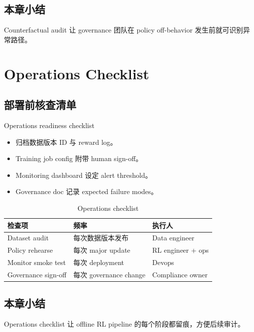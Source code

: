 \documentclass[a4paper]{article}
\begin{document}
\subsection{本章小结}

Counterfactual audit 让 governance 团队在 policy off-behavior 发生前就可识别异常路径。

\section{Operations Checklist}

\subsection{部署前核查清单}

\begin{knowledgebox}{Operations readiness checklist}
\begin{itemize}
    \item 归档数据版本 ID 与 reward log。
    \item Training job config 附带 human sign-off。
    \item Monitoring dashboard 设定 alert threshold。
    \item Governance doc 记录 expected failure modes。
\end{itemize}
\end{knowledgebox}

\begin{table}[H]
\centering
\begin{tabular}{p{} p{} p{}}
\toprule
检查项 & 频率 & 执行人 \\
\midrule
Dataset audit & 每次数据版本发布 & Data engineer \\
Policy rehearse & 每次 major update & RL engineer + ops \\
Monitor smoke test & 每次 deployment & Devops \\
Governance sign-off & 每次 governance change & Compliance owner \\
\bottomrule
\end{tabular}
\caption{Operations checklist}
\end{table}

\subsection{本章小结}

Operations checklist 让 offline RL pipeline 的每个阶段都留痕，方便后续审计。
\end{document}
